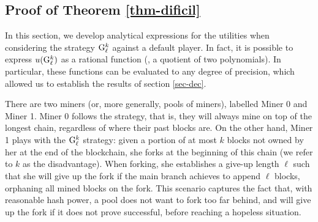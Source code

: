
\subsection{Proof of Theorem \ref{thm-dificil}}

\label{sec-evaluation-G}
In this section, we develop analytical expressions for the utilities when
considering the strategy ${\rm {G}}^k_\ell$ against a default player. In fact, it is
possible to express $u({\rm {G}}^k_\ell)$ as a rational function (\ie, a quotient of
two polynomials). In particular, these functions can be evaluated to any degree
of precision, which allowed us to establish the results of section
\ref{sec-dec}.


There are two miners (or, more generally, pools of miners), labelled Miner 0
and Miner 1. Miner 0 follows the \cdf{} strategy, that is, they will always
mine on top of the longest chain, regardless of where their past blocks are. On
the other hand, Miner 1 plays with the ${\rm {G}}^k_\ell$ strategy: given a portion
of at most $k$ blocks not owned by her at the end of the blockchain, she forks
at the beginning of this chain (we refer to $k$ as the disadvantage). When
forking, she establishes a give-up length $\ell$ such that she will give up the
fork if the main branch achieves to append $\ell$ blocks, orphaning all mined
blocks on the fork. This scenario captures the fact that, with reasonable hash
power, a pool does not want to fork too far behind, and will give up the fork
if it does not prove successful, before reaching a hopeless situation.




